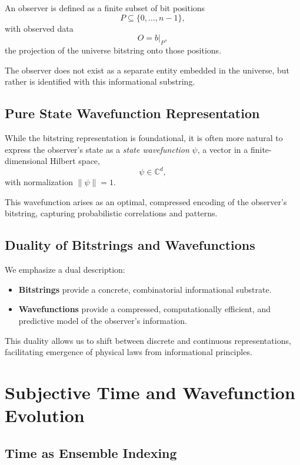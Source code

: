 \documentclass[12pt]{article}
\begin{document}
An observer is defined as a finite subset of bit positions
\[
      P \subseteq \{0, \dots, n-1\},
\]
with observed data
\[
      O = b|_P,
\]
the projection of the universe bitstring onto those positions.

The observer does not exist as a separate entity embedded in the universe, but rather is identified with this informational substring.

\subsection{Pure State Wavefunction Representation}

While the bitstring representation is foundational, it is often more natural to express the observer's state as a \emph{state wavefunction} \(\psi\), a vector in a finite-dimensional Hilbert space,
\[
      \psi \in \mathbb{C}^d,
\]
with normalization \(\|\psi\|=1\).

This wavefunction arises as an optimal, compressed encoding of the observer's bitstring, capturing probabilistic correlations and patterns.

\subsection{Duality of Bitstrings and Wavefunctions}

We emphasize a dual description:

\begin{itemize}
      \item \textbf{Bitstrings} provide a concrete, combinatorial informational substrate.
      \item \textbf{Wavefunctions} provide a compressed, computationally efficient, and predictive model of the observer's information.
\end{itemize}

This duality allows us to shift between discrete and continuous representations, facilitating emergence of physical laws from informational principles.

\section{Subjective Time and Wavefunction Evolution}

\subsection{Time as Ensemble Indexing}
\end{document}
